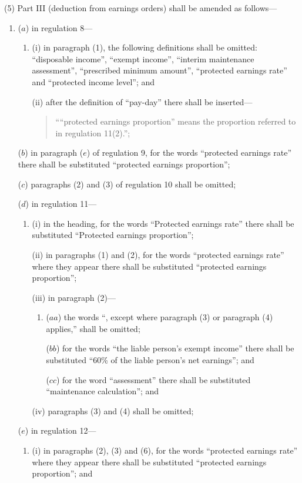 \documentclass[12pt,a4paper]{article}
\begin{document}
(5) Part III (deduction from earnings orders) shall be amended as follows—
\begin{enumerate}\item[]
($a$) in regulation 8—
\begin{enumerate}\item[]
(i) in paragraph (1), the following definitions shall be omitted: “disposable income”, “exempt income”, “interim maintenance assessment”, “prescribed minimum amount”, “protected earnings rate” and “protected income level”; and

(ii) after the definition of “pay-day” there shall be inserted—
\begin{quotation}
““protected earnings proportion” means the proportion referred to in regulation 11(2).”;
\end{quotation}
\end{enumerate}

($b$) in paragraph ($e$)  of regulation 9, for the words “protected earnings rate” there shall be substituted “protected earnings proportion”;

($c$) paragraphs (2) and (3) of regulation 10 shall be omitted;

($d$) in regulation 11—
\begin{enumerate}\item[]
(i) in the heading, for the words “Protected earnings rate” there shall be substituted “Protected earnings proportion”;

(ii) in paragraphs (1) and (2), for the words “protected earnings rate” where they appear there shall be substituted “protected earnings proportion”;

(iii) in paragraph (2)—
\begin{enumerate}\item[]
($aa$) the words “, except where paragraph (3) or paragraph (4) applies,” shall be omitted;

($bb$) for the words “the liable person’s exempt income” there shall be substituted “60\% of the liable person’s net earnings”; and

($cc$) for the word “assessment” there shall be substituted “maintenance calculation”; and
\end{enumerate}

(iv) paragraphs (3) and (4) shall be omitted;
\end{enumerate}

($e$) in regulation 12—
\begin{enumerate}\item[]
(i) in paragraphs (2), (3) and (6), for the words “protected earnings rate” where they appear there shall be substituted “protected earnings proportion”; and


\end{enumerate}
\end{enumerate}
\end{document}
